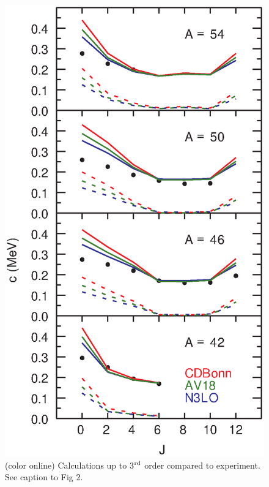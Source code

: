 \documentclass[10pt,showpacs,preprintnumbers,footinbib,amsmath,amssymb,aps,prl,twocolumn,groupedaddress,superscriptaddress,showkeys]{revtex4-1}
\begin{document}
\begin{figure}
\includegraphics[scale=0.35]{c3.eps}
\caption{(color online) Calculations up to 3$^{\rm rd}$ order compared to
experiment. See caption to Fig 2.}
\end{figure}
\end{document}
